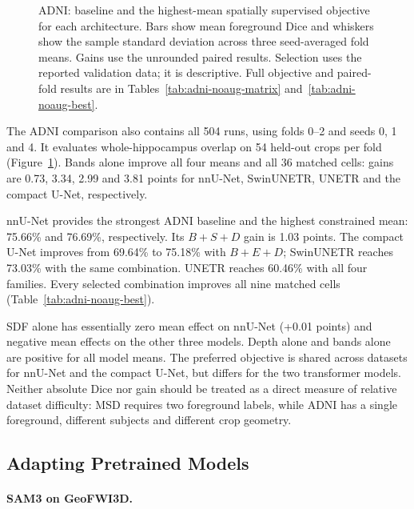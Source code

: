 \documentclass[12pt,a4paper]{article}
\begin{document}
\begin{figure}[htbp]
\caption{ADNI: baseline and the highest-mean spatially supervised objective for each architecture. Bars show mean foreground Dice and whiskers show the sample standard deviation across three seed-averaged fold means. Gains use the unrounded paired results. Selection uses the reported validation data; it is descriptive. Full objective and paired-fold results are in Tables~\ref{tab:adni-noaug-matrix} and~\ref{tab:adni-noaug-best}.}
\label{fig:adni-key-results}
\end{figure}


The ADNI comparison also contains all 504 runs, using folds 0--2 and
seeds 0, 1 and 4. It evaluates whole-hippocampus overlap on 54 held-out
crops per fold (Figure~\ref{fig:adni-key-results}). Bands alone improve all four means and all 36 matched
cells: gains are 0.73, 3.34, 2.99 and 3.81 points for nnU-Net,
SwinUNETR, UNETR and the compact U-Net, respectively.


nnU-Net provides the strongest ADNI baseline and the highest constrained
mean: 75.66\% and 76.69\%, respectively. Its $B+S+D$ gain is 1.03
points. The compact U-Net improves from 69.64\% to 75.18\% with
$B+E+D$; SwinUNETR reaches 73.03\% with the same combination. UNETR
reaches 60.46\% with all four families. Every selected combination
improves all nine matched cells (Table~\ref{tab:adni-noaug-best}).

SDF alone has essentially zero mean effect on nnU-Net (+0.01 points)
and negative mean effects on the other three models. Depth alone and
bands alone are positive for all model means. The preferred objective
is shared across datasets for nnU-Net and the compact U-Net, but differs
for the two transformer models. Neither absolute Dice nor gain should
be treated as a direct measure of relative dataset difficulty: MSD
requires two foreground labels, while ADNI has a single foreground,
different subjects and different crop geometry.


\FloatBarrier
\subsection{Adapting Pretrained Models}
\paragraph{SAM3 on GeoFWI3D.}
\label{sec:sam3-results}
\end{document}
